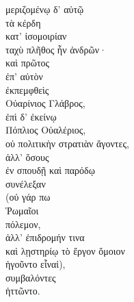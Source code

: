 
{\large
\begin{greek}
\noindent  μεριζομένῳ δ' αὐτῷ \\
\tabto{2em} τὰ κέρδη \\
\tabto{4em} κατ' ἰσομοιρίαν \\
ταχὺ πλῆθος ἦν ἀνδρῶν· \\
καὶ πρῶτος \\
\tabto{2em} ἐπ' αὐτὸν \\
ἐκπεμφθεὶς \\
\tabto{2em} Οὐαρίνιος Γλάβρος, \\
ἐπὶ δ' ἐκείνῳ \\
\tabto{2em} Πόπλιος Οὐαλέριος, \\
οὐ πολιτικὴν στρατιὰν ἄγοντες, \\

ἀλλ' ὅσους \\
\tabto{2em} ἐν σπουδῇ καὶ παρόδῳ \\
συνέλεξαν \\
(οὐ γάρ πω \\
Ῥωμαῖοι \\
πόλεμον, \\
ἀλλ' ἐπιδρομήν τινα \\
καὶ λῃστηρίῳ τὸ ἔργον ὅμοιον \\
ἡγοῦντο εἶναἰ), \\
\tabto{2em} συμβαλόντες \\
ἡττῶντο. \\

\end{greek}
}

